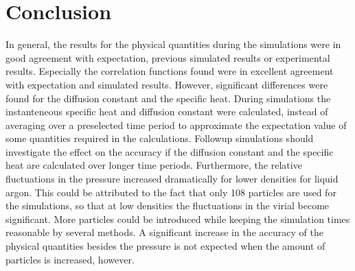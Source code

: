 \section{Conclusion}

In general, the results for the physical quantities during the simulations were in good agreement with expectation, previous simulated results or experimental results. Especially the correlation functions found were in excellent agreement with expectation and simulated results. However, significant differences were found for the diffusion constant and the specific heat. During simulations the instanteneous specific heat and diffusion constant were calculated, instead of averaging over a preselected time period to approximate the expectation value of some quantities required in the calculations. Followup simulations should investigate the effect on the accuracy if the diffusion constant and the specific heat are calculated over longer time periods. Furthermore, the relative fluctuations in the pressure increased dramatically for lower densities for liquid argon. This could be attributed to the fact that only 108 particles are used for the simulations, so that at low densities the fluctuations in the virial become significant. More particles could be introduced while keeping the simulation times reasonable by several methods\cite{PhysRev.159.98}\cite{thompson1983use}. A significant increase in the accuracy of the physical quantities besides the pressure is not expected when the amount of particles is increased, however.